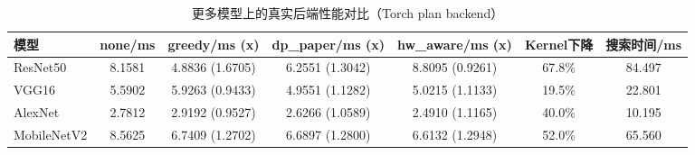\begin{table}[htbp]
\centering
\caption{更多模型上的真实后端性能对比（Torch plan backend）}
\label{tab:generalization_main}
\begin{tabular}{l c c c c c c}
\hline
模型 & none/ms & greedy/ms (x) & dp\_paper/ms (x) & hw\_aware/ms (x) & Kernel下降 & 搜索时间/ms \\
\hline
ResNet50 & 8.1581 & 4.8836 (1.6705) & 6.2551 (1.3042) & 8.8095 (0.9261) & 67.8\% & 84.497 \\
VGG16 & 5.5902 & 5.9263 (0.9433) & 4.9551 (1.1282) & 5.0215 (1.1133) & 19.5\% & 22.801 \\
AlexNet & 2.7812 & 2.9192 (0.9527) & 2.6266 (1.0589) & 2.4910 (1.1165) & 40.0\% & 10.195 \\
MobileNetV2 & 8.5625 & 6.7409 (1.2702) & 6.6897 (1.2800) & 6.6132 (1.2948) & 52.0\% & 65.560 \\
\hline
\end{tabular}
\end{table}
